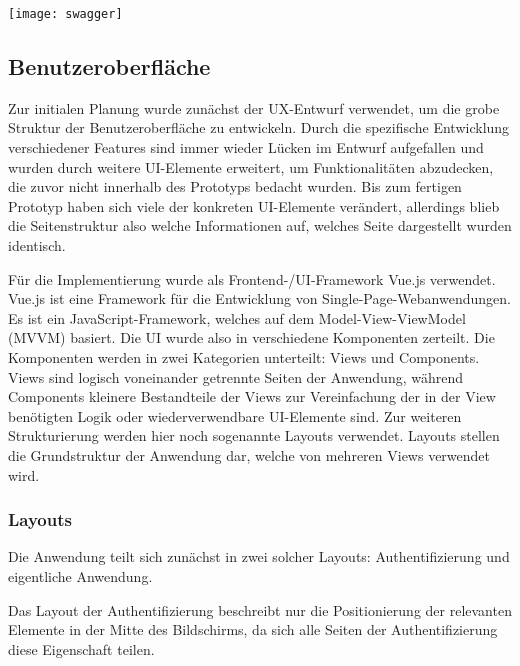 \vspace{20pt}
\begin{center}
    \begin{minipage}{0.95\linewidth}
        \texttt{[image: swagger]}
    \end{minipage}
\end{center}
\vspace{20pt}

\subsection{Benutzeroberfläche}
Zur initialen Planung wurde zunächst der UX-Entwurf verwendet, um die grobe Struktur der Benutzeroberfläche zu entwickeln. Durch die spezifische Entwicklung verschiedener Features sind immer wieder Lücken im Entwurf aufgefallen und wurden durch weitere UI-Elemente erweitert, um Funktionalitäten abzudecken, die zuvor nicht innerhalb des Prototyps bedacht wurden. Bis zum fertigen Prototyp haben sich viele der konkreten UI-Elemente verändert, allerdings blieb die Seitenstruktur also welche Informationen auf, welches Seite dargestellt wurden identisch.

Für die Implementierung wurde als Frontend-/UI-Framework Vue.js verwendet. Vue.js ist eine Framework für die Entwicklung von Single-Page-Webanwendungen. Es ist ein JavaScript-Framework, welches auf dem Model-View-ViewModel (MVVM) basiert. Die UI wurde also in verschiedene Komponenten zerteilt. Die Komponenten werden in zwei Kategorien unterteilt: Views und Components. Views sind logisch voneinander getrennte Seiten der Anwendung, während Components kleinere Bestandteile der Views zur Vereinfachung der in der View benötigten Logik oder wiederverwendbare UI-Elemente sind. Zur weiteren Strukturierung werden hier noch sogenannte Layouts verwendet. Layouts stellen die Grundstruktur der Anwendung dar, welche von mehreren Views verwendet wird.

\subsubsection{Layouts}
Die Anwendung teilt sich zunächst in zwei solcher Layouts: Authentifizierung und eigentliche Anwendung.

Das Layout der Authentifizierung beschreibt nur die Positionierung der relevanten Elemente in der Mitte des Bildschirms, da sich alle Seiten der Authentifizierung diese Eigenschaft teilen.

